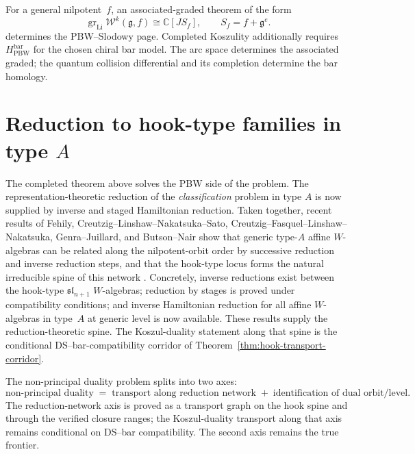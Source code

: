 \begin{remark}
\label{rem:arbitrary-nilpotent-conditional}
For a general nilpotent~$f$, an associated-graded theorem of the form
\[
\operatorname{gr}_{\mathrm{Li}}\mathcal W^k(\mathfrak g,f)
\cong \mathbb C[J S_f],
\qquad
S_f=f+\mathfrak g^e.
\]
determines the PBW--Slodowy page.  Completed Koszulity additionally requires
$H_{\mathrm{PBW}}^{\mathrm{bar}}$ for the chosen chiral bar model.  The arc
space determines the associated graded; the quantum collision differential
and its completion determine the bar homology.
\end{remark}

\section{Reduction to hook-type families in type \texorpdfstring{$A$}{A}}

The completed theorem above solves the PBW side of the problem. The
representation-theoretic reduction of the \emph{classification} problem in type
$A$ is now supplied by inverse and staged Hamiltonian reduction. Taken
together, recent results of Fehily, Creutzig--Linshaw--Nakatsuka--Sato,
Creutzig--Fasquel--Linshaw--Nakatsuka, Genra--Juillard, and Butson--Nair show
that generic type-$A$ affine $W$-algebras can be related along the
nilpotent-orbit order by successive reduction and inverse reduction steps, and
that the hook-type locus forms the natural irreducible spine of this network
\cite{FehilyHook,CLNS24,CFLN24,GenraStages,ButsonNair}. Concretely, inverse
reductions exist between the hook-type $\mathfrak{sl}_{n+1}$ $W$-algebras;
reduction by stages is proved under compatibility conditions; and inverse
Hamiltonian reduction for all affine $W$-algebras in type~$A$ at generic
level is now available. These results supply the reduction-theoretic spine.
The Koszul-duality statement along that spine is the conditional
DS--bar-compatibility corridor of
Theorem~\ref{thm:hook-transport-corridor}.

\begin{principle}
\label{princ:transport-orbit-factorization}
The non-principal duality problem splits into two axes:
\[
\text{non-principal duality}
\;=\;
\text{transport along reduction network}
\;+\;
\text{identification of dual orbit/level}.
\]
The reduction-network axis is proved as a transport graph on the
hook spine and through the verified closure ranges; the
Koszul-duality transport along that axis remains conditional on
DS--bar compatibility. The second axis remains the true frontier.
\end{principle}

